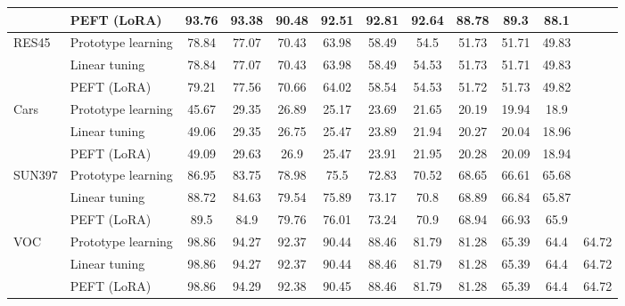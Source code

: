 \begin{tabular}{l l cccccccccc}
 & PEFT (LoRA) & 93.76 & 93.38 & 90.48 & 92.51 & 92.81 & 92.64 & 88.78 & 89.3 & 88.1 \\
\midrule
\multirow{3}{*}{RES45} & Prototype learning & 78.84 & 77.07 & 70.43 & 63.98 & 58.49 & 54.5 & 51.73 & 51.71 & 49.83 \\
 & Linear tuning & 78.84 & 77.07 & 70.43 & 63.98 & 58.49 & 54.53 & 51.73 & 51.71 & 49.83 \\
 & PEFT (LoRA) & 79.21 & 77.56 & 70.66 & 64.02 & 58.54 & 54.53 & 51.72 & 51.73 & 49.82 \\
\midrule
\multirow{3}{*}{Cars} & Prototype learning & 45.67 & 29.35 & 26.89 & 25.17 & 23.69 & 21.65 & 20.19 & 19.94 & 18.9 \\
 & Linear tuning & 49.06 & 29.35 & 26.75 & 25.47 & 23.89 & 21.94 & 20.27 & 20.04 & 18.96 \\
 & PEFT (LoRA) & 49.09 & 29.63 & 26.9 & 25.47 & 23.91 & 21.95 & 20.28 & 20.09 & 18.94 \\
\midrule
\multirow{3}{*}{SUN397} & Prototype learning & 86.95 & 83.75 & 78.98 & 75.5 & 72.83 & 70.52 & 68.65 & 66.61 & 65.68 \\
 & Linear tuning & 88.72 & 84.63 & 79.54 & 75.89 & 73.17 & 70.8 & 68.89 & 66.84 & 65.87 \\
 & PEFT (LoRA) & 89.5 & 84.9 & 79.76 & 76.01 & 73.24 & 70.9 & 68.94 & 66.93 & 65.9 \\
\midrule
\multirow{3}{*}{VOC} & Prototype learning & 98.86 & 94.27 & 92.37 & 90.44 & 88.46 & 81.79 & 81.28 & 65.39 & 64.4 & 64.72 \\
 & Linear tuning & 98.86 & 94.27 & 92.37 & 90.44 & 88.46 & 81.79 & 81.28 & 65.39 & 64.4 & 64.72 \\
 & PEFT (LoRA) & 98.86 & 94.29 & 92.38 & 90.45 & 88.46 & 81.79 & 81.28 & 65.39 & 64.4 & 64.72 \\
\midrule
\bottomrule
\end{tabular}
